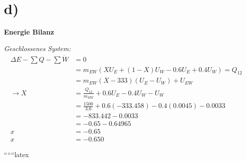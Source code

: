 

\section*{d)}

\textbf{Energie Bilanz}

\textit{Geschlossenes System:} 
\begin{align*}
\Delta E - \sum Q - \sum \dot{W} &= 0 \\
&= m_{EW} \left( X U_E + (1 - X) U_W - 0.6 U_E + 0.4 U_W \right) = Q_{12} \\
&= m_{EW} \left( X - 333 \right) \left( U_E - U_W \right) + U_{EW} \\
\rightarrow X &= \frac{Q_{12}}{m_{EW}} + 0.6 U_E - 0.4 U_W - U_W \\
&= \frac{1500}{3.6} + 0.6 \left( -333.458 \right) - 0.4 \left( 0.0045 \right) - 0.0033 \\
&= -833.442 - 0.0033 \\
&= -0.65 - 0.64965 \\
x &= -0.65 \\
x &= -0.650
\end{align*}

``````latex